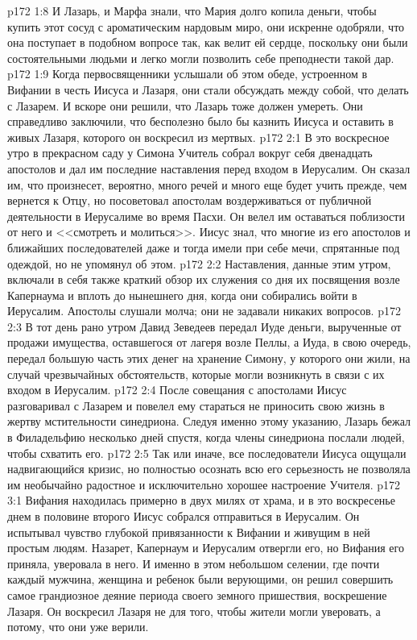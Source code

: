 \vs p172 1:8 И Лазарь, и Марфа знали, что Мария долго копила деньги, чтобы купить этот сосуд с ароматическим нардовым миро, они искренне одобряли, что она поступает в подобном вопросе так, как велит ей сердце, поскольку они были состоятельными людьми и легко могли позволить себе преподнести такой дар.
\vs p172 1:9 Когда первосвященники услышали об этом обеде, устроенном в Вифании в честь Иисуса и Лазаря, они стали обсуждать между собой, что делать с Лазарем. И вскоре они решили, что Лазарь тоже должен умереть. Они справедливо заключили, что бесполезно было бы казнить Иисуса и оставить в живых Лазаря, которого он воскресил из мертвых.
\vs p172 2:1 В это воскресное утро в прекрасном саду у Симона Учитель собрал вокруг себя двенадцать апостолов и дал им последние наставления перед входом в Иерусалим. Он сказал им, что произнесет, вероятно, много речей и много еще будет учить прежде, чем вернется к Отцу, но посоветовал апостолам воздерживаться от публичной деятельности в Иерусалиме во время Пасхи. Он велел им оставаться поблизости от него и <<смотреть и молиться>>. Иисус знал, что многие из его апостолов и ближайших последователей даже и тогда имели при себе мечи, спрятанные под одеждой, но не упомянул об этом.
\vs p172 2:2 Наставления, данные этим утром, включали в себя также краткий обзор их служения со дня их посвящения возле Капернаума и вплоть до нынешнего дня, когда они собирались войти в Иерусалим. Апостолы слушали молча; они не задавали никаких вопросов.
\vs p172 2:3 В тот день рано утром Давид Зеведеев передал Иуде деньги, вырученные от продажи имущества, оставшегося от лагеря возле Пеллы, а Иуда, в свою очередь, передал большую часть этих денег на хранение Симону, у которого они жили, на случай чрезвычайных обстоятельств, которые могли возникнуть в связи с их входом в Иерусалим.
\vs p172 2:4 После совещания с апостолами Иисус разговаривал с Лазарем и повелел ему стараться не приносить свою жизнь в жертву мстительности синедриона. Следуя именно этому указанию, Лазарь бежал в Филадельфию несколько дней спустя, когда члены синедриона послали людей, чтобы схватить его.
\vs p172 2:5 Так или иначе, все последователи Иисуса ощущали надвигающийся кризис, но полностью осознать всю его серьезность не позволяла им необычайно радостное и исключительно хорошее настроение Учителя.
\vs p172 3:1 Вифания находилась примерно в двух милях от храма, и в это воскресенье днем в половине второго Иисус собрался отправиться в Иерусалим. Он испытывал чувство глубокой привязанности к Вифании и живущим в ней простым людям. Назарет, Капернаум и Иерусалим отвергли его, но Вифания его приняла, уверовала в него. И именно в этом небольшом селении, где почти каждый мужчина, женщина и ребенок были верующими, он решил совершить самое грандиозное деяние периода своего земного пришествия, воскрешение Лазаря. Он воскресил Лазаря не для того, чтобы жители могли уверовать, а потому, что они уже верили.
